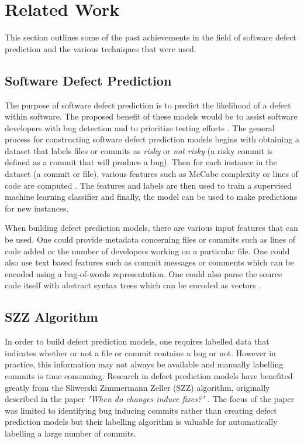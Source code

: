 \documentclass[../main.tex]{subfiles}
\begin{document}
\section{Related Work}

This section outlines some of the past achievements in the field of software defect prediction and the various techniques that were used. 

\subsection{Software Defect Prediction}

The purpose of software defect prediction is to predict the likelihood of a defect within software. The proposed benefit of these models would be to assist software developers with bug detection and to prioritize testing efforts \cite{briski2008minimizing}. The general process for constructing software defect prediction models begins with obtaining a dataset that labels files or commits as \emph{risky} or \emph{not risky} (a risky commit is defined as a commit that will produce a bug). Then for each instance in the dataset (a commit or file), various features such as McCabe complexity or lines of code are computed \cite{zhang2007predicting}. The features and labels are then used to train a supervised machine learning classifier and finally, the model can be used to make predictions for new instances. 

When building defect prediction models, there are various input features that can be used. One could provide metadata concerning files or commits such as lines of code added or the number of developers working on a particular file. One could also use text based features such as commit messages or comments which can be encoded using a bag-of-words representation. One could also parse the source code itself with abstract syntax trees which can be encoded as vectors \cite{tan2015online}.


\subsection{SZZ Algorithm}

In order to build defect prediction models, one requires labelled data that indicates whether or not a file or commit contains a bug or not. However in practice, this information may not always be available and manually labelling commits is time consuming. Research in defect prediction models have benefited greatly from the Sliwerski Zimmermann Zeller (SZZ) algorithm, originally described in the paper \textit{"When do changes induce fixes?"} \cite{sliwerski2005changes}. The focus of the paper was limited to identifying bug inducing commits rather than creating defect prediction models but their labelling algorithm is valuable for automatically labelling a large number of commits. 
\end{document}
